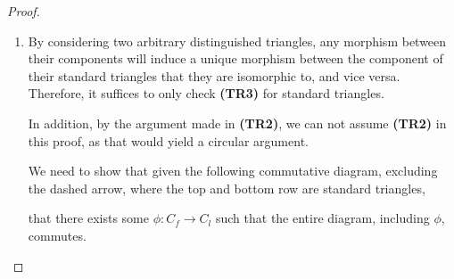 \begin{proof}
\begin{enumerate}[label={(\bfseries TR\arabic*)}]
{\begin{center}
            \end{center}
        }
        \item {
            By considering two arbitrary distinguished triangles, any morphism between their components will induce a unique morphism between the component of their standard triangles that they are isomorphic to, and vice versa. Therefore, it suffices to only check {\bf (TR3)} for standard triangles.

            In addition, by the argument made in {\bf (TR2)}, we can not assume {\bf (TR2)} in this proof, as that would yield a circular argument.

            We need to show that given the following commutative diagram, excluding the dashed arrow, where the top and bottom row are standard triangles,
            \begin{diagramlabel}[\label{eq:stablemod}]
            \end{diagramlabel}
            that there exists some \( \phi: C_f \to C_l \) such that the entire diagram, including \( \phi \), commutes.

}
\end{enumerate}
\end{proof}
